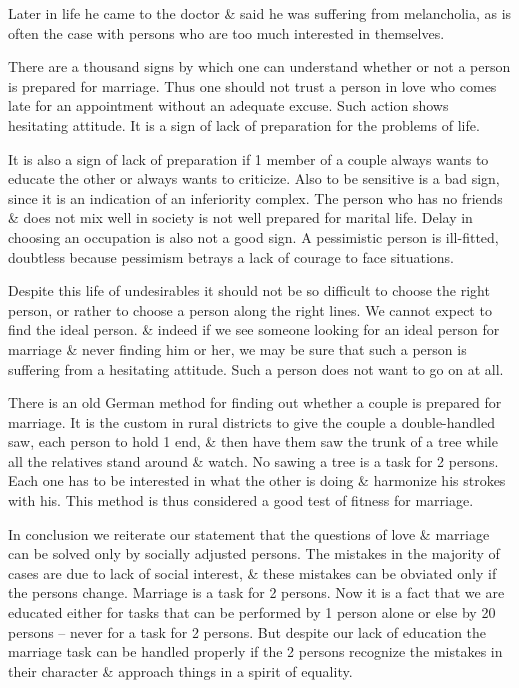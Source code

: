 \documentclass{article}
\begin{document}
Later in life he came to the doctor \& said he was suffering from melancholia, as is often the case with persons who are too much interested in themselves.

There are a thousand signs by which one can understand whether or not a person is prepared for marriage. Thus one should not trust a person in love who comes late for an appointment without an adequate excuse. Such action shows hesitating attitude. It is a sign of lack of preparation for the problems of life.

It is also a sign of lack of preparation if 1 member of a couple always wants to educate the other or always wants to criticize. Also to be sensitive is a bad sign, since it is an indication of an inferiority complex. The person who has no friends \& does not mix well in society is not well prepared for marital life. Delay in choosing an occupation is also not a good sign. A pessimistic person is ill-fitted, doubtless because pessimism betrays a lack of courage to face situations.

Despite this life of undesirables it should not be so difficult to choose the right person, or rather to choose a person along the right lines. We cannot expect to find the ideal person. \& indeed if we see someone looking for an ideal person for marriage \& never finding him or her, we may be sure that such a person is suffering from a hesitating attitude. Such a person does not want to go on at all.

There is an old German method for finding out whether a couple is prepared for marriage. It is the custom in rural districts to give the couple a double-handled saw, each person to hold 1 end, \& then have them saw the trunk of a tree while all the relatives stand around \& watch. No sawing a tree is a task for 2 persons. Each one has to be interested in what the other is doing \& harmonize his strokes with his. This method is thus considered a good test of fitness for marriage.

In conclusion we reiterate our statement that the questions of love \& marriage can be solved only by socially adjusted persons. The mistakes in the majority of cases are due to lack of social interest, \& these mistakes can be obviated only if the persons change. Marriage is a task for 2 persons. Now it is a fact that we are educated either for tasks that can be performed by 1 person alone or else by 20 persons -- never for a task for 2 persons. But despite our lack of education the marriage task can be handled properly if the 2 persons recognize the mistakes in their character \& approach things in a spirit of equality.
\end{document}
